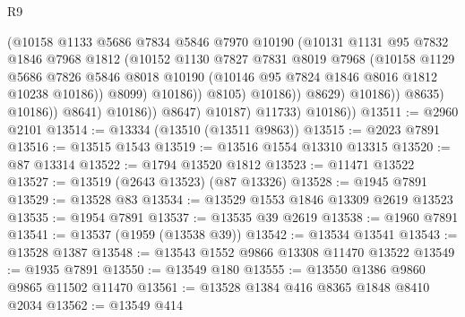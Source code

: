 \begin{lexlean}{R9}
\begin{coremodule}
                                      (@10158
                                        @1133
                                        @5686
                                        @7834
                                        @5846
                                        @7970
                                        @10190
                                        (@10131
                                          @1131
                                          @95
                                          @7832
                                          @1846
                                          @7968
                                          @1812
                                          (@10152
                                            @1130
                                            @7827
                                            @7831
                                            @8019
                                            @7968
                                            (@10158
                                              @1129
                                              @5686
                                              @7826
                                              @5846
                                              @8018
                                              @10190
                                              (@10146 @95 @7824 @1846 @8016 @1812 @10238 @10186))
                                            @8099)
                                          @10186))
                                      @8105)
                                    @10186))
                                @8629)
                              @10186))
                          @8635)
                        @10186))
                    @8641)
                  @10186))
              @8647)
            @10187)
          @11733)
        @10186))
@13511 := @2960 @2101
@13514 := @13334 (@13510 (@13511 @9863))
@13515 := @2023 @7891
@13516 := @13515 @1543
@13519 := @13516 @1554 @13310 @13315
@13520 := @87 @13314
@13522 := @1794 @13520 @1812
@13523 := @11471 @13522
@13527 := @13519 (@2643 @13523) (@87 @13326)
@13528 := @1945 @7891
@13529 := @13528 @83
@13534 := @13529 @1553 @1846 @13309 @2619 @13523
@13535 := @1954 @7891
@13537 := @13535 @39 @2619
@13538 := @1960 @7891
@13541 := @13537 (@1959 (@13538 @39))
@13542 := @13534 @13541
@13543 := @13528 @1387
@13548 := @13543 @1552 @9866 @13308 @11470 @13522
@13549 := @1935 @7891
@13550 := @13549 @180
@13555 := @13550 @1386 @9860 @9865 @11502 @11470
@13561 := @13528 @1384 @416 @8365 @1848 @8410 @2034
@13562 := @13549 @414

\end{coremodule}
\end{lexlean}

